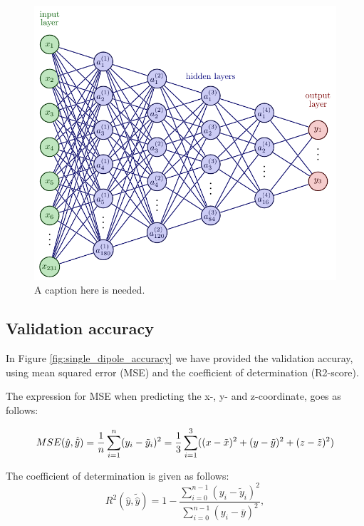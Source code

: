 \documentclass[a4paper, UKenglish, 11pt]{uiomaster}
\begin{document}
\begin{figure}
  \includegraphics[width=\linewidth]{figures/NN_simple_dipole_architecture.pdf}
  \caption{A caption here is needed.}
  \label{fig:NN_architecture.png}
\end{figure}

\subsection{Validation accuracy}
In Figure \ref{fig:single_dipole_accuracy} we have provided the validation accuray, using mean squared error (MSE) and the coefficient of determination (R2-score).

The expression for MSE when predicting the x-, y- and z-coordinate, goes as follows:

\begin{equation}
MSE(\hat{y},\hat{\tilde{y}}) = \frac{1}{n}
\sum_{i=1}^{n}(y_i-\tilde{y}_i)^2 \\
= \frac{1}{3}\sum_{i=1}^{3}((x-\tilde{x})^2 + (y-\tilde{y})^2 + (z-\tilde{z})^2 )
\label{eq:MSE}
\end{equation}

The coefficient of determination is given as follows:
\begin{equation}
R^2(\hat{y}, \tilde{\hat{y}}) = 1 - \frac{\sum_{i=0}^{n - 1} (y_i - \tilde{y}_i)^2}{\sum_{i=0}^{n - 1} (y_i - \bar{y})^2},
\label{eq:R2}
\end{equation}
\end{document}
